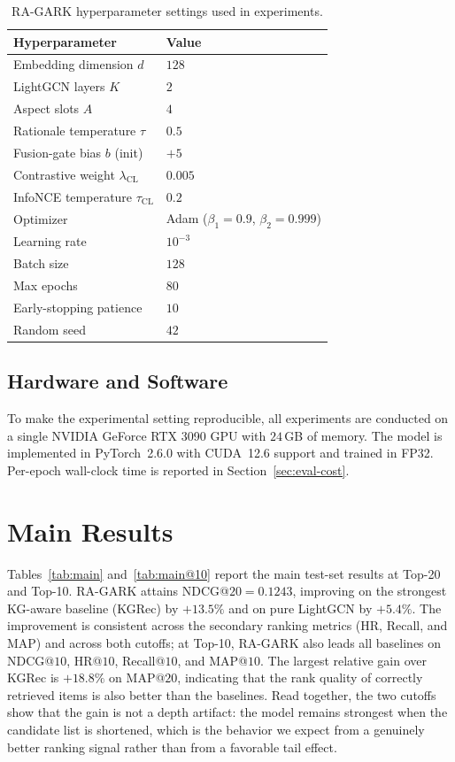 \begin{table}[H]
\centering
\caption{RA-GARK hyperparameter settings used in experiments.}
\label{tab:hparams}
\begin{tabular}{ll}
\toprule
Hyperparameter & Value \\
\midrule
Embedding dimension $d$            & $128$ \\
LightGCN layers $K$                & $2$ \\
Aspect slots $A$                   & $4$ \\
Rationale temperature $\tau$       & $0.5$ \\
Fusion-gate bias $b$ (init)        & $+5$ \\
Contrastive weight $\lambda_{\mathrm{CL}}$ & $0.005$ \\
InfoNCE temperature $\tau_{\mathrm{CL}}$   & $0.2$ \\
Optimizer                          & Adam ($\beta_1{=}0.9$, $\beta_2{=}0.999$) \\
Learning rate                      & $10^{-3}$ \\
Batch size                         & $128$ \\
Max epochs                         & $80$ \\
Early-stopping patience            & $10$ \\
Random seed                        & $42$ \\
\bottomrule
\end{tabular}
\end{table}
\FloatBarrier

\subsection{Hardware and Software}
\label{sec:eval-env}

To make the experimental setting reproducible, all experiments are conducted on a single NVIDIA GeForce RTX 3090 GPU with $24$\,GB of memory. The model is implemented in PyTorch~2.6.0 with CUDA~12.6 support and trained in FP32. Per-epoch wall-clock time is reported in Section~\ref{sec:eval-cost}.

\section{Main Results}
\label{sec:eval-main}

Tables~\ref{tab:main} and~\ref{tab:main@10} report the main test-set results at Top-20 and Top-10. RA-GARK attains NDCG@$20 = 0.1243$, improving on the strongest KG-aware baseline (KGRec) by $+13.5\%$ and on pure LightGCN by $+5.4\%$. The improvement is consistent across the secondary ranking metrics (HR, Recall, and MAP) and across both cutoffs; at Top-10, RA-GARK also leads all baselines on NDCG@$10$, HR@$10$, Recall@$10$, and MAP@$10$. The largest relative gain over KGRec is $+18.8\%$ on MAP@$20$, indicating that the rank quality of correctly retrieved items is also better than the baselines. Read together, the two cutoffs show that the gain is not a depth artifact: the model remains strongest when the candidate list is shortened, which is the behavior we expect from a genuinely better ranking signal rather than from a favorable tail effect.

